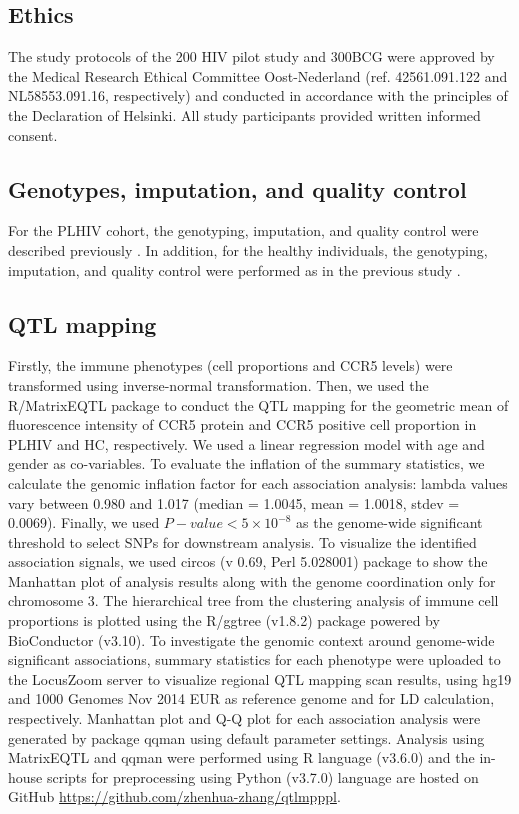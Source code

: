\documentclass{book}
\begin{document}
\begin{refsection}
\subsection*{Ethics}
The study protocols of the 200 HIV pilot study and 300BCG were approved by the Medical Research Ethical Committee Oost-Nederland (ref. 42561.091.122 and NL58553.091.16, respectively) and conducted in accordance with the principles of the Declaration of Helsinki.
All study participants provided written informed consent.

\subsection*{Genotypes, imputation, and quality control}
For the PLHIV cohort, the genotyping, imputation, and quality control were described previously \cite{Zhang2021IRF7,van2021Chronic}.
In addition, for the healthy individuals, the genotyping, imputation, and quality control were performed as in the previous study \cite{Moorlag2021An}.

\subsection*{QTL mapping}
Firstly, the immune phenotypes (cell proportions and CCR5 levels) were transformed using inverse-normal transformation.
Then, we used the R/MatrixEQTL package \cite{Shabalin2012Matrix} to conduct the QTL mapping for the geometric mean of fluorescence intensity of CCR5 protein and CCR5 positive cell proportion in PLHIV and HC, respectively.
We used a linear regression model with age and gender as co-variables.
To evaluate the inflation of the summary statistics, we calculate the genomic inflation factor for each association analysis: lambda values vary between 0.980 and 1.017 (median = 1.0045, mean = 1.0018, stdev = 0.0069).
Finally, we used $P-value < 5 \times 10^{-8}$ as the genome-wide significant threshold to select SNPs for downstream analysis.
To visualize the identified association signals, we used circos \cite{Krzywinski2009Circos} (v 0.69, Perl 5.028001) package to show the Manhattan plot of analysis results along with the genome coordination only for chromosome 3.
The hierarchical tree from the clustering analysis of immune cell proportions is plotted using the R/ggtree \cite{Yu2020Using} (v1.8.2) package powered by BioConductor (v3.10).
To investigate the genomic context around genome-wide significant associations, summary statistics for each phenotype were uploaded to the LocusZoom \cite{Pruim2010LocusZoom} server to visualize regional QTL mapping scan results, using hg19 and 1000 Genomes Nov 2014 EUR as reference genome and for LD calculation, respectively.
Manhattan plot and Q-Q plot for each association analysis were generated by package qqman \cite{D2018qqman} using default parameter settings.
Analysis using MatrixEQTL and qqman were performed using R language (v3.6.0) and the in-house scripts for preprocessing using Python (v3.7.0) language are hosted on GitHub \url{https://github.com/zhenhua-zhang/qtlmpppl}.


\end{refsection}
\end{document}
